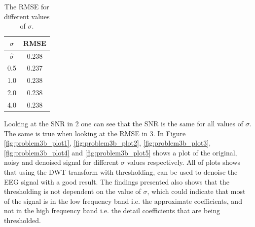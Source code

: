 \begin{table}[H]
    \label{tbl:rmse_values_for_different_sigmas}
    \centering

    \begin{tabular}{c|c}
        \hline
        $\sigma$ & RMSE \\
        \hline
        
        $\hat{\sigma}$ & 0.238 \\
        0.5 & 0.237 \\
        1.0 & 0.238 \\
        2.0 & 0.238 \\
        4.0 & 0.238 \\

    \end{tabular}

    \caption{The RMSE for different values of $\sigma$.}
\end{table}


Looking at the SNR in  2 one can see that the SNR is the same for all values of $\sigma$. The same is true when looking at the RMSE in  3. In Figure \ref{fig:problem3b_plot1}, \ref{fig:problem3b_plot2}, \ref{fig:problem3b_plot3}, \ref{fig:problem3b_plot4} and \ref{fig:problem3b_plot5} shows a plot of the original, noisy and denoised signal for different $\sigma$ values respectively. All of plots shows that using the DWT transform with thresholding, can be used to denoise the EEG signal with a good result. The findings presented also shows that the thresholding is not dependent on the value of $\sigma$, which could indicate that most of the signal is in the low frequency band i.e. the approximate coefficients, and not in the high frequency band i.e. the detail coefficients that are being thresholded.
